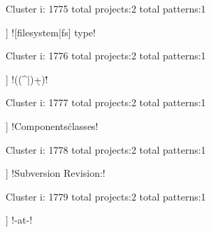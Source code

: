 Cluster i: 1775
total projects:2
total patterns:1
\begin{multicols}{1}
\begin{description}[noitemsep,topsep=0pt]
\item [[2] ] \cverb![filesystem|fs] type!
\end{description}
\end{multicols}







Cluster i: 1776
total projects:2
total patterns:1
\begin{multicols}{1}
\begin{description}[noitemsep,topsep=0pt]
\item [[2] ] \cverb!((^|\n)\s*\d+)\.!
\end{description}
\end{multicols}







Cluster i: 1777
total projects:2
total patterns:1
\begin{multicols}{1}
\begin{description}[noitemsep,topsep=0pt]
\item [[2] ] \cverb!Components\.classes!
\end{description}
\end{multicols}







Cluster i: 1778
total projects:2
total patterns:1
\begin{multicols}{1}
\begin{description}[noitemsep,topsep=0pt]
\item [[2] ] \cverb!Subversion Revision:!
\end{description}
\end{multicols}







Cluster i: 1779
total projects:2
total patterns:1
\begin{multicols}{1}
\begin{description}[noitemsep,topsep=0pt]
\item [[2] ] \cverb!\s*-\s*at\s*-\s*!
\end{description}
\end{multicols}







